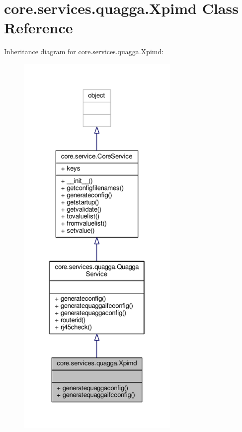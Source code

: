 \hypertarget{classcore_1_1services_1_1quagga_1_1_xpimd}{\section{core.\+services.\+quagga.\+Xpimd Class Reference}
\label{classcore_1_1services_1_1quagga_1_1_xpimd}
}


Inheritance diagram for core.\+services.\+quagga.\+Xpimd\+:
\nopagebreak
\begin{figure}[H]
\begin{center}
\leavevmode
\includegraphics[height=550pt]{classcore_1_1services_1_1quagga_1_1_xpimd__inherit__graph}
\end{center}
\end{figure}


